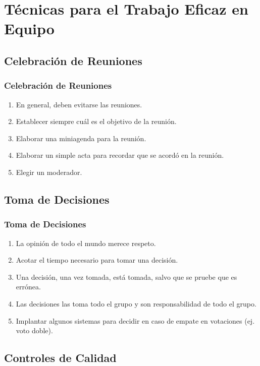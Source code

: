 \documentclass[a4paper,slidestop,xcolor=pst,dvips,blue]{beamer}
\begin{document}
\section{Técnicas para el Trabajo Eficaz en Equipo}

\subsection{Celebración de Reuniones}

\begin{frame}[c]
	\frametitle{Celebración de Reuniones}
	\begin{enumerate}[<+->]
		\item En general, deben evitarse las reuniones.
		\item Establecer siempre cuál es el objetivo de la reunión.
		\item Elaborar una miniagenda para la reunión.
		\item Elaborar un simple acta para recordar que se acordó en la reunión.
		\item Elegir un moderador.
	\end{enumerate}
\end{frame}

\subsection{Toma de Decisiones}

\begin{frame}[c]
	\frametitle{Toma de Decisiones}
	\begin{enumerate}[<+->]
		\item La opinión de todo el mundo merece respeto.
		\item Acotar el tiempo necesario para tomar una decisión.
		\item Una decisión, una vez tomada, está tomada, salvo que se pruebe que es errónea.
		\item Las decisiones las toma todo el grupo y son responsabilidad de todo el grupo.
		\item Implantar algunos sistemas para decidir en caso de empate en votaciones (ej. voto doble).
	\end{enumerate}
\end{frame}

\subsection{Controles de Calidad}
\end{document}
